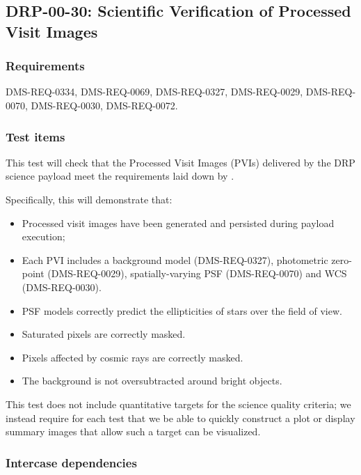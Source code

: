 \subsection{DRP-00-30: Scientific Verification of Processed Visit Images}
\label{drp-00-30}

\subsubsection{Requirements}

DMS-REQ-0334, DMS-REQ-0069, DMS-REQ-0327, DMS-REQ-0029, DMS-REQ-0070,
DMS-REQ-0030, DMS-REQ-0072.

\subsubsection{Test items}
\label{drp-00-30-items}

This test will check that the Processed Visit Images (PVIs) delivered by the
DRP science payload meet the requirements laid down by .

Specifically, this will demonstrate that:

\begin{itemize}

  \item{Processed visit images have been generated and persisted during
  payload execution;}
  \item{Each PVI includes a background model (DMS-REQ-0327), photometric
  zero-point (DMS-REQ-0029), spatially-varying PSF (DMS-REQ-0070) and WCS
  (DMS-REQ-0030).}
  \item{PSF models correctly predict the ellipticities of stars over the field of view.}
  \item{Saturated pixels are correctly masked.}
  \item{Pixels affected by cosmic rays are correctly masked.}
  \item{The background is not oversubtracted around bright objects.}

\end{itemize}

This test does not include quantitative targets for the science quality criteria; we instead require for each test that we be able to quickly construct a plot or display summary images that allow such a target can be visualized.

\subsubsection{Intercase dependencies}

